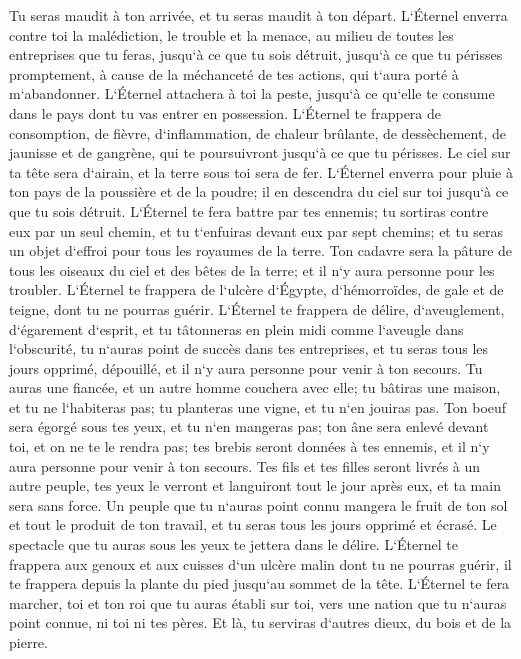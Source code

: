 \verse Tu seras maudit à ton arrivée, et tu seras maudit à ton départ. 
\verse L`Éternel enverra contre toi la malédiction, le trouble et la menace, au milieu de toutes les entreprises que tu feras, jusqu`à ce que tu sois détruit, jusqu`à ce que tu périsses promptement, à cause de la méchanceté de tes actions, qui t`aura porté à m`abandonner. 
\verse L`Éternel attachera à toi la peste, jusqu`à ce qu`elle te consume dans le pays dont tu vas entrer en possession. 
\verse L`Éternel te frappera de consomption, de fièvre, d`inflammation, de chaleur brûlante, de dessèchement, de jaunisse et de gangrène, qui te poursuivront jusqu`à ce que tu périsses. 
\verse Le ciel sur ta tête sera d`airain, et la terre sous toi sera de fer. 
\verse L`Éternel enverra pour pluie à ton pays de la poussière et de la poudre; il en descendra du ciel sur toi jusqu`à ce que tu sois détruit. 
\verse L`Éternel te fera battre par tes ennemis; tu sortiras contre eux par un seul chemin, et tu t`enfuiras devant eux par sept chemins; et tu seras un objet d`effroi pour tous les royaumes de la terre. 
\verse Ton cadavre sera la pâture de tous les oiseaux du ciel et des bêtes de la terre; et il n`y aura personne pour les troubler. 
\verse L`Éternel te frappera de l`ulcère d`Égypte, d`hémorroïdes, de gale et de teigne, dont tu ne pourras guérir. 
\verse L`Éternel te frappera de délire, d`aveuglement, d`égarement d`esprit, 
\verse et tu tâtonneras en plein midi comme l`aveugle dans l`obscurité, tu n`auras point de succès dans tes entreprises, et tu seras tous les jours opprimé, dépouillé, et il n`y aura personne pour venir à ton secours. 
\verse Tu auras une fiancée, et un autre homme couchera avec elle; tu bâtiras une maison, et tu ne l`habiteras pas; tu planteras une vigne, et tu n`en jouiras pas. 
\verse Ton boeuf sera égorgé sous tes yeux, et tu n`en mangeras pas; ton âne sera enlevé devant toi, et on ne te le rendra pas; tes brebis seront données à tes ennemis, et il n`y aura personne pour venir à ton secours. 
\verse Tes fils et tes filles seront livrés à un autre peuple, tes yeux le verront et languiront tout le jour après eux, et ta main sera sans force. 
\verse Un peuple que tu n`auras point connu mangera le fruit de ton sol et tout le produit de ton travail, et tu seras tous les jours opprimé et écrasé. 
\verse Le spectacle que tu auras sous les yeux te jettera dans le délire. 
\verse L`Éternel te frappera aux genoux et aux cuisses d`un ulcère malin dont tu ne pourras guérir, il te frappera depuis la plante du pied jusqu`au sommet de la tête. 
\verse L`Éternel te fera marcher, toi et ton roi que tu auras établi sur toi, vers une nation que tu n`auras point connue, ni toi ni tes pères. Et là, tu serviras d`autres dieux, du bois et de la pierre. 

